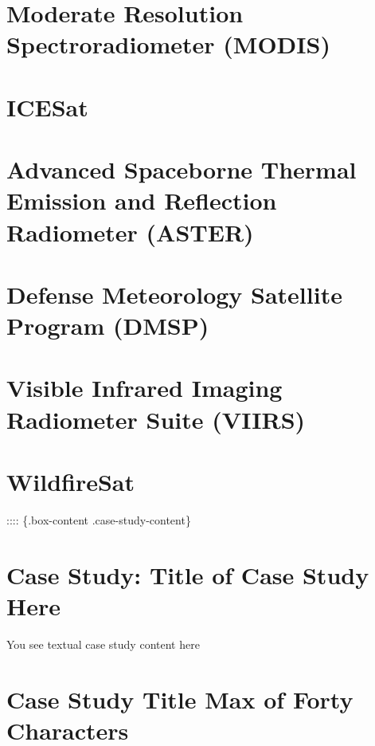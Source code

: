 \documentclass[
]{book}
\begin{document}
\hypertarget{moderate-resolution-spectroradiometer-modis}{%
\section{Moderate Resolution Spectroradiometer (MODIS)}\label{moderate-resolution-spectroradiometer-modis}}

\hypertarget{icesat}{%
\section{ICESat}\label{icesat}}

\hypertarget{advanced-spaceborne-thermal-emission-and-reflection-radiometer-aster}{%
\section{Advanced Spaceborne Thermal Emission and Reflection Radiometer (ASTER)}\label{advanced-spaceborne-thermal-emission-and-reflection-radiometer-aster}}

\hypertarget{defense-meteorology-satellite-program-dmsp}{%
\section{Defense Meteorology Satellite Program (DMSP)}\label{defense-meteorology-satellite-program-dmsp}}

\hypertarget{visible-infrared-imaging-radiometer-suite-viirs}{%
\section{Visible Infrared Imaging Radiometer Suite (VIIRS)}\label{visible-infrared-imaging-radiometer-suite-viirs}}

\hypertarget{wildfiresat}{%
\section{WildfireSat}\label{wildfiresat}}

:::: \{.box-content .case-study-content\}

\hypertarget{case-study-title-of-case-study-here-7}{%
\section{Case Study: Title of Case Study Here}\label{case-study-title-of-case-study-here-7}}

You see textual case study content here

\hypertarget{box-text}{%
\section*{Case Study Title Max of Forty Characters}\label{box-text}}
\end{document}
